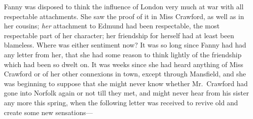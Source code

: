 \documentclass{article}
\begin{document}
Fanny was disposed to think the influence of London
very much at war with all respectable attachments.
She saw the proof of it in Miss Crawford, as well as in
her cousins; \emph{her} attachment to Edmund had been respectable,
the most respectable part of her character; her friendship
for herself had at least been blameless.  Where was
either sentiment now?  It was so long since Fanny had had
any letter from her, that she had some reason to think
lightly of the friendship which had been so dwelt on.
It was weeks since she had heard anything of Miss Crawford
or of her other connexions in town, except through Mansfield,
and she was beginning to suppose that she might never
know whether Mr.\ Crawford had gone into Norfolk again
or not till they met, and might never hear from his
sister any more this spring, when the following letter
was received to revive old and create some new sensations---%
\end{document}
